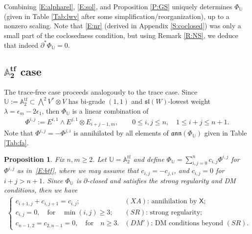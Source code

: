 \documentclass[pdftex]{sigma}%
\newcommand\tensor{\otimes}
\DeclareMathOperator{\tf}{tf}
\newcommand\fann{\mathfrak{ann}}
\newcommand\fsl{\mathfrak{sl}}
\newcommand\bbU{\mathbb{U}}
\newcommand\bbA{\mathbb{A}}
\newcommand\sfX{\mathsf{X}}
\numberwithin{equation}{section}
\newtheorem{Proposition}[Theorem]{Proposition}
 { \theoremstyle{definition}
\newtheorem{Definition}[Theorem]{Definition}
\newtheorem{Note}[Theorem]{Note}
\newtheorem{Example}[Theorem]{Example}
\newtheorem{Remark}[Theorem]{Remark} }
\begin{document}
Combining \eqref{E:alpharel}, \eqref{E:sol}, and Proposition \ref{P:GS} uniquely determines $\Phi_{\bbU}$ (given in Table \ref{Tab:lwv} after some simplification/reorganization), up to a nonzero scaling. Note that \eqref{E:nr} (derived in Appendix \ref{S:coclosed}) was only a small part of the coclosedness condition, but using Remark \ref{R:NS}, we deduce that indeed $\partial^*\Phi_{\bbU} = 0$.

\subsection[A\_2\^{}\{tf\} case]{$\boldsymbol{\bbA_2^{\tf}}$ case} The trace-free case proceeds analogously to the trace case. Since $\bbU := \bbA_2^{\tf} \subset \bigwedge^2 V^* \otimes V$ has bi-grade $(1,1)$ and $\fsl(W)$-lowest weight $\lambda =\epsilon_m -2\epsilon_1$, then $\Phi_\bbU$ is a linear combination of
\begin{align}\label{E:btf}
\Phi^{i,j} := E^{i,1} \wedge E^{j,1} \tensor E_{i+j-1,m}, \qquad 0 \le i,j \le n,\quad 1 \le i+j \le n+1.
\end{align}
Note that $\Phi^{i,j} = -\Phi^{j,i}$ is annihilated by all elements of $\fann(\Phi_\bbU)$ given in Table \ref{Tab:fa}.

\begin{Proposition}\label{P:GS1} Fix $n,m \geq 2$.
Let $\bbU = \bbA_2^{\tf}$ and define $\Phi_\bbU = \sum_{i,j=0}^n c_{i,j} \Phi^{i,j}$ for $\Phi^{i,j}$ as in~\eqref{E:btf}, where we may assume that $c_{i,j} = -c_{j,i}$, and $c_{i,j} =0$ for $i+j>n+1$. Since $\Phi_\bbU$ is $\partial$-closed and satisfies the strong regularity and DM conditions, then we have
\begin{align}\label{E:GStf}
\begin{cases}
c_{i+1,j} + c_{i,j+1} = c_{i,j};& \text{$(XA)$: annihilation by $\sfX$;}\\
c_{i,j}{}= 0,\quad \text{for}\quad \min(i,j)\ge 3;&\text{$(SR)$: strong regularity;}\\
c_{n-1,2}=c_{2,n-1}= 0,\quad \text{for}\quad n\ge 3. & \text{$(DM')$: DM conditions beyond $(SR)$.}
\end{cases}
\end{align}
\end{Proposition}
\end{document}
